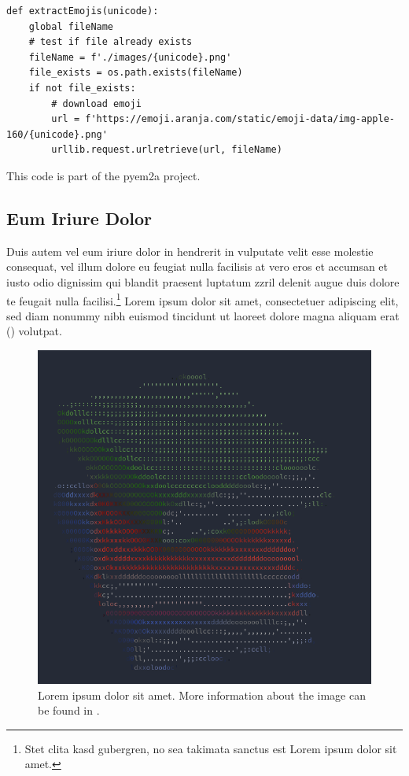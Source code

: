 \begin{code}
\begin{verbatim}
def extractEmojis(unicode):
    global fileName
    # test if file already exists
    fileName = f'./images/{unicode}.png'
    file_exists = os.path.exists(fileName)
    if not file_exists:
        # download emoji
        url = f'https://emoji.aranja.com/static/emoji-data/img-apple-160/{unicode}.png'
        urllib.request.urlretrieve(url, fileName)
\end{verbatim}
\caption{This code is part of the pyem2a project.}
\label{code:pyem2a}
\end{code}

\subsection{Eum Iriure Dolor}
Duis autem vel eum iriure dolor in hendrerit in vulputate velit esse molestie consequat, vel illum dolore eu feugiat nulla facilisis at vero eros et accumsan et iusto odio dignissim qui blandit praesent luptatum zzril delenit augue duis dolore te feugait nulla facilisi.\footnote{Stet clita kasd gubergren, no sea takimata sanctus est Lorem ipsum dolor sit amet.} Lorem ipsum dolor sit amet, consectetuer adipiscing elit, sed diam nonummy nibh euismod tincidunt ut laoreet dolore magna aliquam erat () volutpat.

\begin{figure}
    \includegraphics{figures/books.png}
    \caption[Lorem ipsum dolor sit amet.]{Lorem ipsum dolor sit amet. More information about the image can be found in .}
    \label{fig:books1}
\end{figure}

